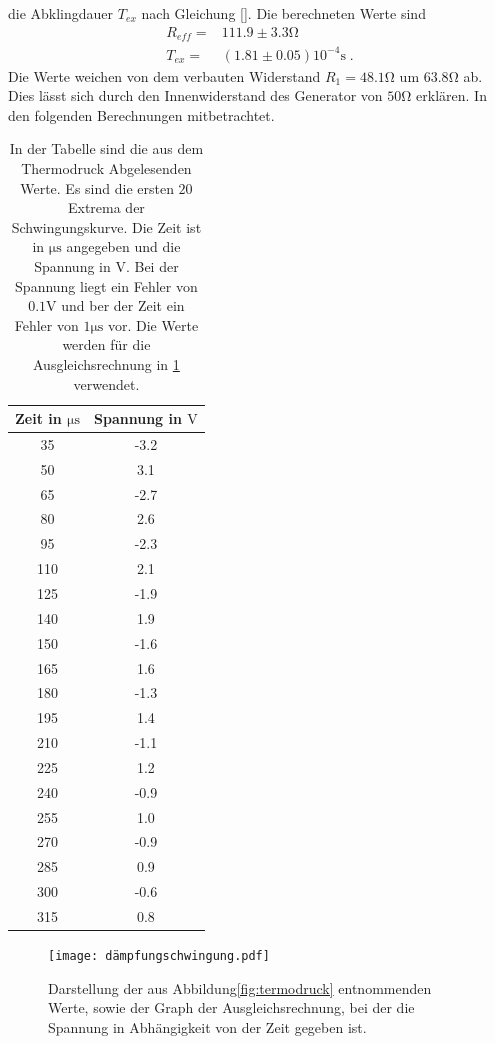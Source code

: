 die Abklingdauer $T_{ex}$ nach Gleichung \eqref{}. Die berechneten Werte sind
\begin{align*}
    R_{eff}=&111.9\pm3.3\si{\ohm}\\
    T_{ex}=&(1.81\pm0.05)10^{-4}\si{\second}\;.
\end{align*}
Die Werte weichen von dem verbauten Widerstand $R_1=48.1\si{\ohm}$ um $63.8\si{\ohm}$
ab. Dies lässt sich durch den Innenwiderstand des Generator von $50\si{\ohm}$ erklären.
In den folgenden Berechnungen mitbetrachtet.
\begin{table}
  \centering
  \begin{tabular}{c c}
    \toprule
    Zeit in $\si{\micro\second}$ & Spannung in $\si{\volt}$  \\
    \midrule
     35  &  -3.2  \\
     50  &   3.1  \\
     65  &  -2.7  \\
     80  &   2.6  \\
     95  &  -2.3  \\
    110  &   2.1  \\
    125  &  -1.9  \\
    140  &   1.9  \\
    150  &  -1.6  \\
    165  &   1.6  \\
    180  &  -1.3  \\
    195  &   1.4  \\
    210  &  -1.1  \\
    225  &   1.2  \\
    240  &  -0.9  \\
    255  &   1.0  \\
    270  &  -0.9  \\
    285  &   0.9  \\
    300  &  -0.6  \\
    315  &   0.8  \\
    \bottomrule
  \end{tabular}
  \caption{In der Tabelle sind die aus dem Thermodruck Abgelesenden Werte.
           Es sind die ersten $20$ Extrema der Schwingungskurve. Die Zeit ist
            in  $\si{\micro\second}$ angegeben und die Spannung in $\si{\volt}$.
            Bei der Spannung liegt ein Fehler von $0.1\si{\volt}$ und ber der Zeit
            ein Fehler von $1\si{\micro\second}$ vor. Die Werte werden für die
            Ausgleichsrechnung in \ref{fig:gedaempfteschwingung} verwendet.}
\end{table}
\begin{figure}
  \centering
  \texttt{[image: dämpfungschwingung.pdf]}
  \caption{Darstellung der aus Abbildung\ref{fig:termodruck} entnommenden Werte,
           sowie der Graph der Ausgleichsrechnung, bei der die Spannung in
           Abhängigkeit von der Zeit gegeben ist.}
  \label{fig:gedaempfteschwingung}
\end{figure}

